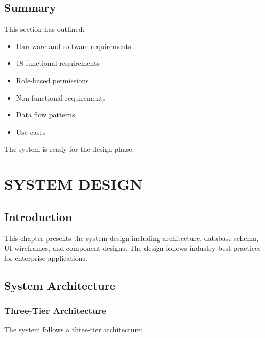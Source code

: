 \documentclass[12pt,a4paper,twoside]{book}
\begin{document}
\section{Summary}

This section has outlined:
\begin{itemize}
    \item Hardware and software requirements
    \item 18 functional requirements
    \item Role-based permissions
    \item Non-functional requirements
    \item Data flow patterns
    \item Use cases
\end{itemize}

The system is ready for the design phase.

\chapter{SYSTEM DESIGN}

\section{Introduction}

This chapter presents the system design including architecture, database schema, UI wireframes, and component designs. The design follows industry best practices for enterprise applications.

\section{System Architecture}

\subsection{Three-Tier Architecture}

The system follows a three-tier architecture:
\end{document}
